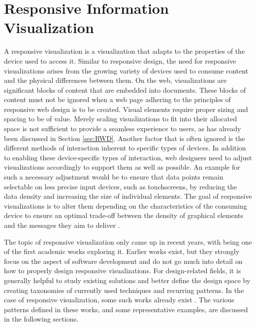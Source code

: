 \chapter{Responsive Information Visualization}

A responsive visualization is a visualization that adapts to the properties of the device used to access it. Similar to responsive design, the need for responsive visualizations arises from the growing variety of devices used to consume content and the physical differences between them. On the web, visualizations are significant blocks of content that are embedded into documents. These blocks of content must not be ignored when a web page adhering to the principles of responsive web design is to be created. Visual elements require proper sizing and spacing to be of value. Merely scaling visualizations to fit into their allocated space is not sufficient to provide a seamless experience to users, as has already been discussed in Section \ref{sec:RWD}. Another factor that is often ignored is the different methods of interaction inherent to specific types of devices. In addition to enabling these device-specific types of interaction, web designers need to adjust visualizations accordingly to support them as well as possible. An example for such a necessary adjustment would be to ensure that data points remain selectable on less precise input devices, such as touchscreens, by reducing the data density and increasing the size of individual elements. The goal of responsive visualizations is to alter them depending on the characteristics of the consuming device to ensure an optimal trade-off between the density of graphical elements and the messages they aim to deliver \parencite{DesignPatternsTradeOffsRespVis}. 

The topic of responsive visualization only came up in recent years, with \cite{RespVis} being one of the first academic works exploring it. Earlier works \parencite{BuildingRespDataVisForTheWeb,LearningRespDataVis} exist, but they strongly focus on the aspect of software development and do not go much into detail on how to properly design responsive visualizations.  For design-related fields, it is generally helpful to study existing solutions and better define the design space by creating taxonomies of currently used techniques and recurring patterns.  In the case of responsive visualization, some such works already exist \parencite{TechniquesForFlexibleRespVisDesign,DesignPatternsTradeOffsRespVis,RespVisSurvey}. The various patterns defined in these works, and some representative examples, are discussed in the following sections.

